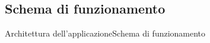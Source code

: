\documentclass[10pt]{beamer}
\begin{document}
\subsection{Schema di funzionamento}
\begin{frame}{Architettura dell'applicazione}{Schema di funzionamento}



\end{frame}








{\1
\begin{frame}
\end{frame}}
\end{document}
